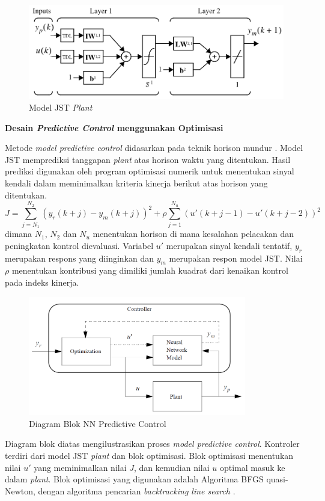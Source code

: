 \begin{figure}[!h]
	\centering
	\includegraphics[width=1\textwidth]{figures/modelJSTPlant}
	\caption{Model JST \textit{Plant}}
	\label{fig:3:NNPlantModel}
\end{figure}

\noindent \textbf{Desain \textit{Predictive Control} menggunakan Optimisasi}

Metode \textit{model predictive control} didasarkan pada teknik horison mundur \cite{article23}. Model JST memprediksi tanggapan \textit{plant} atas horison waktu yang ditentukan. Hasil prediksi digunakan oleh program optimisasi numerik untuk menentukan sinyal kendali dalam meminimalkan kriteria kinerja berikut atas horison yang ditentukan.
\begin{equation} \label{eq:3:performance}
J = \sum_{j=N_1}^{N_2} (y_r(k+j) - y_m(k+j))^2 + \rho\sum_{j=1}^{N_u} (u'(k+j-1) - u'(k+j-2))^2
\end{equation}
dimana $N_1$, $N_2$ dan $N_u$ menentukan horison di mana kesalahan pelacakan dan peningkatan kontrol dievaluasi. Variabel $u'$ merupakan sinyal kendali tentatif, $y_r$ merupakan respons yang diinginkan dan $y_m$ merupakan respon model JST. Nilai $\rho$ menentukan kontribusi yang dimiliki jumlah kuadrat dari kenaikan kontrol pada indeks kinerja.
\begin{figure}[!h]
	\centering
	\includegraphics[width=0.85\textwidth]{figures/NNPredictiveControl}
	\caption{Diagram Blok NN Predictive Control}
	\label{fig:3:nncontrolblock}
\end{figure}

Diagram blok diatas mengilustrasikan proses \textit{model predictive control}. Kontroler terdiri dari model JST \textit{plant} dan blok optimisasi. Blok optimisasi menentukan nilai $u'$ yang meminimalkan nilai $J$, dan kemudian nilai $u$ optimal masuk ke dalam \textit{plant}. Blok optimisasi yang digunakan adalah Algoritma BFGS quasi-Newton, dengan algoritma pencarian \textit{backtracking line search} \cite{article24}.